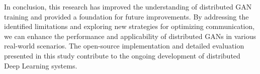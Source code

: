 In conclusion, this research has improved the understanding of distributed GAN training and provided a foundation for future improvements. By addressing the identified limitations and exploring new strategies for optimizing communication, we can enhance the performance and applicability of distributed GANs in various real-world scenarios. The open-source implementation and detailed evaluation presented in this study contribute to the ongoing development of distributed Deep Learning systems.



